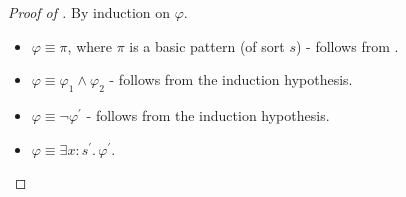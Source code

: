 \begin{proof}[Proof of ]
By induction on $\varphi$.
\begin{itemize}
    \item $\varphi \equiv \pi$, where $\pi$ is a basic pattern (of sort $s$) - follows from .
    \item $\varphi \equiv \varphi_1 \land \varphi_2$ - follows from the induction hypothesis.
    \item $\varphi \equiv \neg \varphi^\prime$ - follows from the induction hypothesis.
    \item $\varphi \equiv \exists x : s^\prime.\, \varphi^\prime$.


\end{itemize}
\end{proof}
